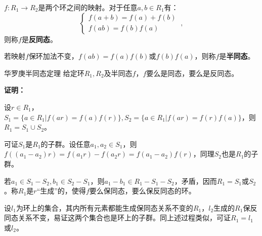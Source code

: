 
\begin{definition}{}
$f:R_1\rightarrow R_2$是两个环之间的映射。对于任意$a,b\in R_1$有：
\begin{equation}
\left\{\begin{array}{c}
f(a+b)=f(a)+f(b) \\
f(a b)=f(b)f(a)
\end{array}\right.
~,\end{equation}
则称$f$是\textbf{反同态}。

若映射$f$保环加法不变，$f(ab)=f(a)f(b)$或$f(b)f(a)$，则称$f$是\textbf{半同态}。
\end{definition}
\begin{theorem}{华罗庚半同态定理}
给定环$R_1,R_2$及半同态$f$，$f$要么是同态，要么是反同态。
\end{theorem}
\textbf{证明：}

设$r\in R_1$，$S_1=\{a\in R_1|f(ar)=f(a)f(r)\},S_2=\{a\in R_1|f(ar)=f(r)f(a)\}$，则$R_1=S_1\cup S_2$。

可证$S_1$是$R_1$的子群。设任意$a_1,a_2\in S_1$，则$f((a_1-a_2)r)=f(a_1r)-f(a_2r)=f(a_1-a_2)f(r)$，同理$S_2$也是$R_1$的子群。

若$a_1\in S_1-S_2,b_1\in S_2-S_1$，则$a_1-b_1\in R_1-S_1-S_2$，矛盾，因而$R_1=S_1$或$S_2$。称$R_1$是$r$“生成”的，使得$f$要么保同态，要么保反同态的环。

设$l_1$为环上的集合，其内所有元素都能生成保同态关系不变的$R_1$，$l_2$生成的$R_1$保反同态关系不变，易证这两个集合也是环上的子群。同上述过程类似，可证$R_1=l_1$或$l_2$。
